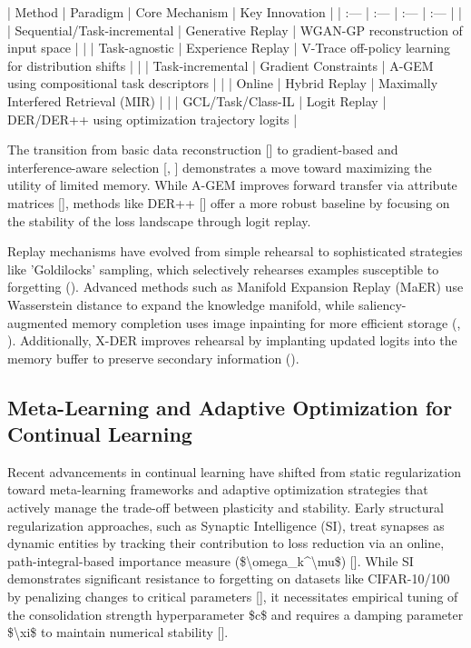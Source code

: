 \documentclass[11pt]{article}
\begin{document}
| Method | Paradigm | Core Mechanism | Key Innovation |
| :--- | :--- | :--- | :--- |
| \citep{1705.08690} | Sequential/Task-incremental | Generative Replay | WGAN-GP reconstruction of input space |
| \citep{1811.11682} | Task-agnostic | Experience Replay | V-Trace off-policy learning for distribution shifts |
| \citep{1812.00420} | Task-incremental | Gradient Constraints | A-GEM using compositional task descriptors |
| \citep{1908.04742} | Online | Hybrid Replay | Maximally Interfered Retrieval (MIR) |
| \citep{2004.07211} | GCL/Task/Class-IL | Logit Replay | DER/DER++ using optimization trajectory logits |

The transition from basic data reconstruction [\citep{1705.08690}] to gradient-based and interference-aware selection [\citep{1903.08671}, \citep{1908.04742}] demonstrates a move toward maximizing the utility of limited memory. While A-GEM improves forward transfer via attribute matrices [\citep{1812.00420}], methods like DER++ [\citep{2004.07211}] offer a more robust baseline by focusing on the stability of the loss landscape through logit replay.

Replay mechanisms have evolved from simple rehearsal to sophisticated strategies like 'Goldilocks' sampling, which selectively rehearses examples susceptible to forgetting (\citep{2406.09935}). Advanced methods such as Manifold Expansion Replay (MaER) use Wasserstein distance to expand the knowledge manifold, while saliency-augmented memory completion uses image inpainting for more efficient storage (\citep{2310.08038}, \citep{2212.13242}). Additionally, X-DER improves rehearsal by implanting updated logits into the memory buffer to preserve secondary information (\citep{2201.00766}).
\subsection{Meta-Learning and Adaptive Optimization for Continual Learning}

Recent advancements in continual learning have shifted from static regularization toward meta-learning frameworks and adaptive optimization strategies that actively manage the trade-off between plasticity and stability. Early structural regularization approaches, such as Synaptic Intelligence (SI), treat synapses as dynamic entities by tracking their contribution to loss reduction via an online, path-integral-based importance measure (\$\textbackslash{}omega\_k\textasciicircum{}\textbackslash{}mu\$) [\citep{1703.04200}]. While SI demonstrates significant resistance to forgetting on datasets like CIFAR-10/100 by penalizing changes to critical parameters [\citep{1703.04200}], it necessitates empirical tuning of the consolidation strength hyperparameter \$c\$ and requires a damping parameter \$\textbackslash{}xi\$ to maintain numerical stability [\citep{1703.04200}].
\end{document}
